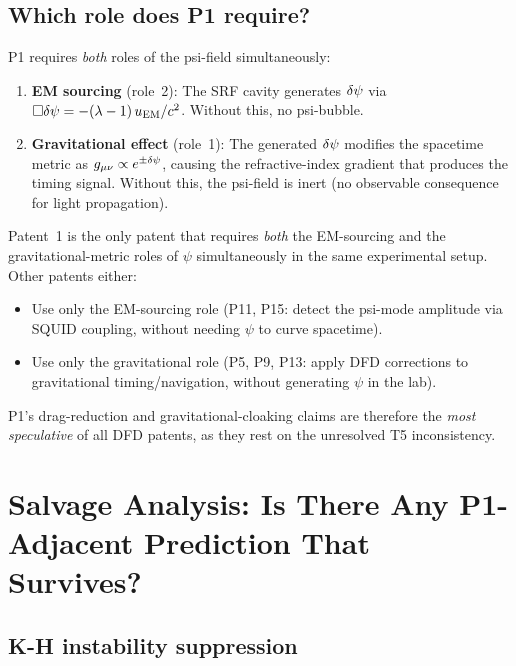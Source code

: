 \subsection{Which role does P1 require?}
\label{ssec:P1_role}

P1 requires \emph{both} roles of the psi-field simultaneously:
\begin{enumerate}[nosep]
\item \textbf{EM sourcing} (role~2): The SRF cavity generates $\delta\psi$ via
  $\Box\delta\psi = -(\lambda-1)\,u_{\rm EM}/c^2$. Without this, no psi-bubble.
\item \textbf{Gravitational effect} (role~1): The generated $\delta\psi$ modifies
  the spacetime metric as $g_{\mu\nu} \propto e^{\pm\delta\psi}$, causing the
  refractive-index gradient that produces the timing signal. Without this,
  the psi-field is inert (no observable consequence for light propagation).
\end{enumerate}

\begin{finding}
\label{find:P1_T5_vulnerable}
Patent~1 is the only patent that requires \emph{both} the EM-sourcing and
the gravitational-metric roles of $\psi$ simultaneously in the same
experimental setup. Other patents either:
\begin{itemize}[nosep]
\item Use only the EM-sourcing role (P11, P15: detect the psi-mode amplitude
  via SQUID coupling, without needing $\psi$ to curve spacetime).
\item Use only the gravitational role (P5, P9, P13: apply DFD corrections to
  gravitational timing/navigation, without generating $\psi$ in the lab).
\end{itemize}

P1's drag-reduction and gravitational-cloaking claims are therefore the
\emph{most speculative} of all DFD patents, as they rest on the unresolved
T5 inconsistency.
\end{finding}

\section{Salvage Analysis: Is There Any P1-Adjacent Prediction That Survives?}
\label{sec:salvage}

\subsection{K-H instability suppression}
\label{ssec:KH}

